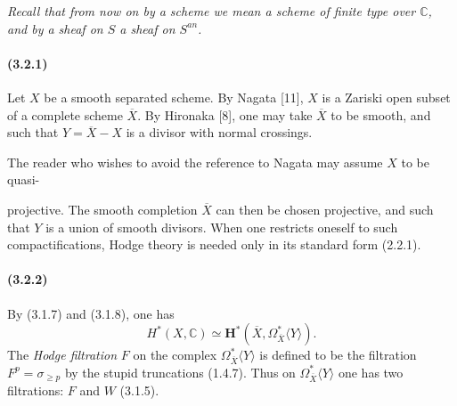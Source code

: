 \documentclass[10pt]{article}
\newcommand{\C}{\mathbb C}
\begin{document}
\emph{Recall that from now on by a scheme we mean a scheme of finite type over $\C$, and by a sheaf on $S$ a sheaf on $S^{an}$.}

\paragraph{(3.2.1)} Let $X$ be a smooth separated scheme. By Nagata [11], $X$ is a Zariski open subset of a complete scheme $\overline X$. By Hironaka [8], one may take $\overline X$ to be smooth, and such that $Y=\overline X-X$ is a divisor with normal crossings.

The reader who wishes to avoid the reference to Nagata may assume $X$ to be quasi-



projective. The smooth completion $\overline X$ can then be chosen projective, and such that $Y$ is a union of smooth divisors. When one restricts oneself to such compactifications, Hodge theory is needed only in its standard form (2.2.1).

\paragraph{(3.2.2)} By (3.1.7) and (3.1.8), one has
\[
H^*(X,\C)\simeq \mathbf H^*(\overline X,\Omega_{\overline X}^{*}\langle Y\rangle).
\]
The \emph{Hodge filtration} $F$ on the complex $\Omega_{\overline X}^{*}\langle Y\rangle$ is defined to be the filtration $F^p=\sigma_{\ge p}$ by the stupid truncations  (1.4.7).  Thus on $\Omega_{\overline X}^{*}\langle Y\rangle$ one has two filtrations: $F$ and $W$ (3.1.5).
\end{document}
